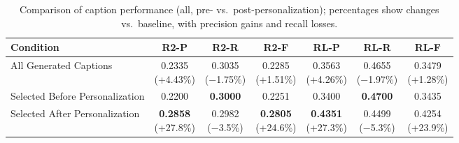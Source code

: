 \documentclass{article} %
\begin{document}
\begin{table}[t]
\begin{subtable}{\linewidth}
\centering
{}
\begin{adjustbox}{max width=0.95\textwidth}
\begin{tabular}{lcccccc}
\toprule
\textbf{Condition} & R2-P & R2-R & R2-F & RL-P & RL-R & RL-F \\
\midrule
All Generated Captions & \makecell{0.2335 \\ (+4.43\%)} & \makecell{0.3035 \\ (−1.75\%)} & \makecell{0.2285 \\ (+1.51\%)} 
& \makecell{0.3563 \\ (+4.26\%)} & \makecell{0.4655 \\ (−1.97\%)} & \makecell{0.3479 \\ (+1.28\%)} \\
Selected Before Personalization & 0.2200 & \textbf{0.3000} & 0.2251 & 0.3400 & \textbf{0.4700} & 0.3435 \\
Selected After Personalization & \makecell{\textbf{0.2858} \\ (+27.8\%)} & \makecell{0.2982 \\ (−3.5\%)} & \makecell{\textbf{0.2805} \\ (+24.6\%)} 
& \makecell{\textbf{0.4351} \\ (+27.3\%)} & \makecell{0.4499 \\ (−5.3\%)} & \makecell{0.4254 \\ (+23.9\%)} \\
\bottomrule
\end{tabular}
\end{adjustbox}
\end{subtable}

\caption{Comparison of caption performance (all, pre- vs.\ post-personalization); percentages show changes vs.\ baseline, with precision gains and recall losses.}

\label{tab:caption-performance-sub}
\end{table}
\FloatBarrier 
\newpage

\end{document}
